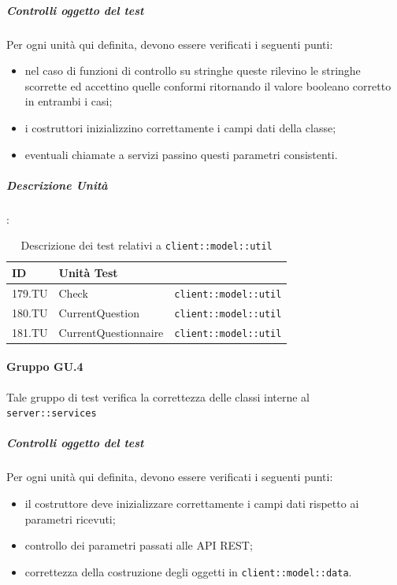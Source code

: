 \documentclass[12pt,a4paper]{article}
\begin{document}
\subparagraph{Controlli oggetto del test}
Per ogni unità  qui definita, devono essere verificati i seguenti punti:

\begin{itemize}
	\item nel caso di funzioni di controllo su stringhe queste rilevino le stringhe scorrette ed accettino quelle conformi ritornando il valore booleano corretto in entrambi i casi;
	\item i costruttori inizializzino correttamente i campi dati della classe;
	\item eventuali chiamate a servizi passino  questi parametri consistenti.
\end{itemize}

\subparagraph{Descrizione Unità}:

\begin{table}[H]
	\begin{center}
		\begin{tabular}{p{} p{} p{}}
			\toprule
			\textbf{ID}   & \textbf{Unità Test}	& \textbf{\mgls{package}} \\ \midrule
			\midrule
			179.TU & Check & \texttt{client::model::util}\\ \midrule
			180.TU & CurrentQuestion & \texttt{client::model::util}\\ \midrule
			181.TU & CurrentQuestionnaire & \texttt{client::model::util}\\ \midrule
			
			\bottomrule
		\end{tabular}
	\end{center}
	\caption{Descrizione dei test relativi a \texttt{client::model::util}}
\end{table}

\paragraph{Gruppo GU.4}
Tale gruppo di test verifica la correttezza delle classi interne al  \texttt{server::services}

\subparagraph{Controlli oggetto del test}
Per ogni unità  qui definita, devono essere verificati i seguenti punti:

\begin{itemize}
	\item il costruttore deve inizializzare correttamente i campi dati rispetto ai parametri ricevuti;
	\item controllo dei parametri passati alle API REST;
	\item correttezza della costruzione degli oggetti in \texttt{client::model::data}.
\end{itemize}
\end{document}
